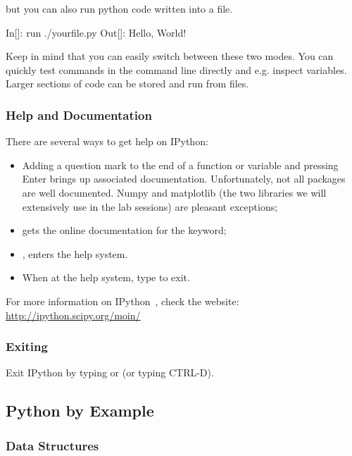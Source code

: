 but you can also run python code written into a file.

\begin{python}
 In[]: run ./yourfile.py
Out[]: Hello, World!
\end{python}

Keep in mind that you can easily switch between these two modes. You can quickly test commands in the command line directly and e.g. inspect variables. Larger sections of code can be stored and run from files.

\subsubsection{Help and Documentation}

There are several ways to get help on IPython:

\begin{itemize}
\item Adding a question mark to the end of a function or variable and pressing Enter brings up associated documentation. Unfortunately, not all packages are well documented. Numpy and matplotlib (the two libraries we will extensively use in the lab sessions) are pleasant exceptions;
\item {} gets the online documentation for the  keyword;
\item {}, enters the help system.
\item When at the help system, type  to exit.
\end{itemize}

\noindent For more information on IPython~\citep{PER-GRA:2007}, check the website: \url{http://ipython.scipy.org/moin/}

\subsubsection{Exiting}

Exit IPython by typing  or  (or typing CTRL-D).

\subsection{Python by Example}


\subsubsection{Data Structures}

